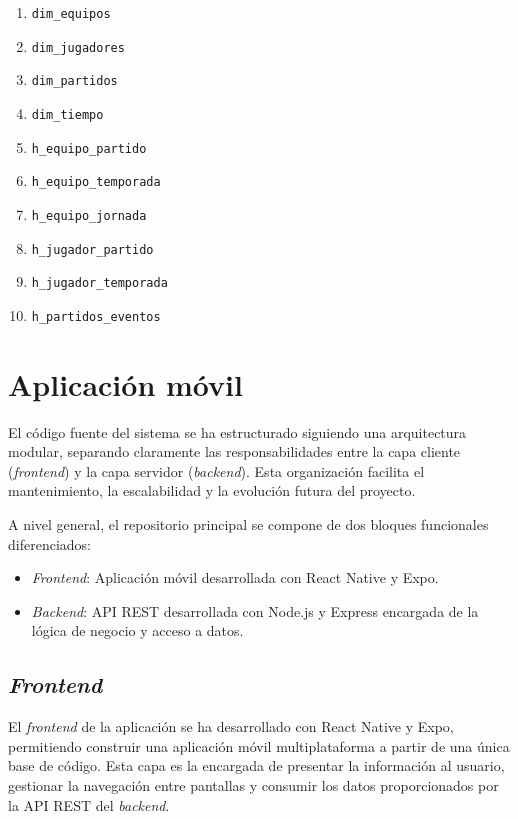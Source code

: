 \begin{enumerate}
    \item \texttt{dim\_equipos}
    \item \texttt{dim\_jugadores}
    \item \texttt{dim\_partidos}
    \item \texttt{dim\_tiempo}
    \item \texttt{h\_equipo\_partido}
    \item \texttt{h\_equipo\_temporada}
    \item \texttt{h\_equipo\_jornada}
    \item \texttt{h\_jugador\_partido}
    \item \texttt{h\_jugador\_temporada}
    \item \texttt{h\_partidos\_eventos}
\end{enumerate}

\section{Aplicación móvil}

El código fuente del sistema se ha estructurado siguiendo una arquitectura modular, separando claramente las responsabilidades entre la capa cliente (\textit{frontend}) y la capa servidor (\textit{backend}). Esta organización facilita el mantenimiento, la escalabilidad y la evolución futura del proyecto.

A nivel general, el repositorio principal se compone de dos bloques funcionales diferenciados:

\begin{itemize}
    \item {\textit{Frontend}:} Aplicación móvil desarrollada con React Native y Expo.
    \item {\textit{Backend}:} API REST desarrollada con Node.js y Express encargada de la lógica de negocio y acceso a datos.
\end{itemize}

\subsection{\textit{Frontend}}

El \textit{frontend} de la aplicación se ha desarrollado con React Native y Expo, permitiendo construir una aplicación móvil multiplataforma a partir de una única base de código. Esta capa es la encargada de presentar la información al usuario, gestionar la navegación entre pantallas y consumir los datos proporcionados por la API REST del \textit{backend}.

